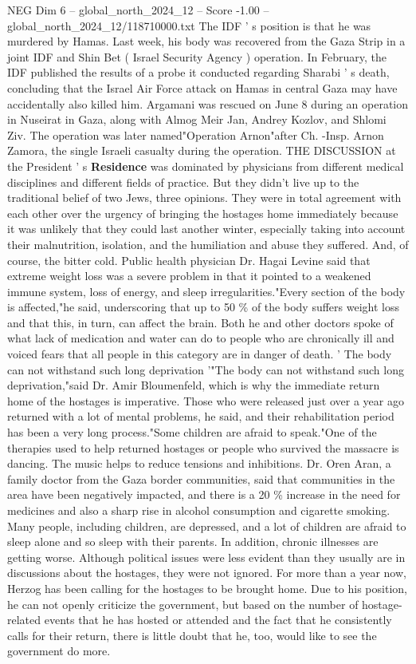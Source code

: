 \begin{textsample}{NEG Dim 6 – global\_north\_2024\_12 – Score -1.00 – global\_north\_2024\_12/118710000.txt}
The IDF ' s position is that he was murdered by Hamas.
Last week, his body was recovered from the Gaza Strip in a joint IDF and Shin Bet ( Israel Security Agency ) operation.
In February, the IDF published the results of a probe it conducted regarding Sharabi ' s death, concluding that the Israel Air Force attack on Hamas in central Gaza may have accidentally also killed him.
Argamani was rescued on June 8 during an operation in Nuseirat in Gaza, along with Almog Meir Jan, Andrey Kozlov, and Shlomi Ziv.
The operation was later named"Operation Arnon"after Ch. -Insp.
Arnon Zamora, the single Israeli casualty during the operation.
THE DISCUSSION at the President ' s \textbf{Residence} was dominated by physicians from different medical disciplines and different fields of practice.
But they didn't live up to the traditional belief of two Jews, three opinions.
They were in total agreement with each other over the urgency of bringing the hostages home immediately because it was unlikely that they could last another winter, especially taking into account their malnutrition, isolation, and the humiliation and abuse they suffered.
And, of course, the bitter cold.
Public health physician Dr.
Hagai Levine said that extreme weight loss was a severe problem in that it pointed to a weakened immune system, loss of energy, and sleep irregularities."Every section of the body is affected,"he said, underscoring that up to 50 \% of the body suffers weight loss and that this, in turn, can affect the brain.
Both he and other doctors spoke of what lack of medication and water can do to people who are chronically ill and voiced fears that all people in this category are in danger of death. ' The body can not withstand such long deprivation '"The body can not withstand such long deprivation,"said Dr.
Amir Bloumenfeld, which is why the immediate return home of the hostages is imperative.
Those who were released just over a year ago returned with a lot of mental problems, he said, and their rehabilitation period has been a very long process."Some children are afraid to speak."One of the therapies used to help returned hostages or people who survived the massacre is dancing.
The music helps to reduce tensions and inhibitions.
Dr.
Oren Aran, a family doctor from the Gaza border communities, said that communities in the area have been negatively impacted, and there is a 20 \% increase in the need for medicines and also a sharp rise in alcohol consumption and cigarette smoking.
Many people, including children, are depressed, and a lot of children are afraid to sleep alone and so sleep with their parents.
In addition, chronic illnesses are getting worse.
Although political issues were less evident than they usually are in discussions about the hostages, they were not ignored.
For more than a year now, Herzog has been calling for the hostages to be brought home.
Due to his position, he can not openly criticize the government, but based on the number of hostage-related events that he has hosted or attended and the fact that he consistently calls for their return, there is little doubt that he, too, would like to see the government do more.

\end{textsample}

